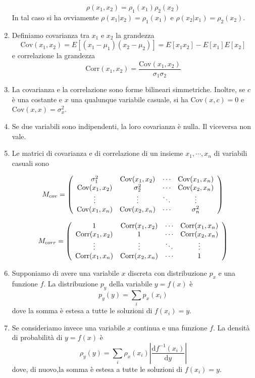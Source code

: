 \documentclass[a4paper,11pt]{article}
\newcommand{\cov}[1]{\textrm{Cov}(#1)}
\newcommand{\corr}[1]{\textrm{Corr}(#1)}
\begin{document}
\begin{enumerate}[resume]
	\[\rho(x_1,x_2)=\rho_1(x_1)\rho_2(x_2)\]
	In tal caso si ha ovviamente $\rho(x_1|x_2)=\rho_1(x_1)$ e $\rho(x_2|x_1)=\rho_2(x_2)$.
	\item Definiamo covarianza tra $x_1$ e $x_2$ la grandezza
	\[\cov{x_1,x_2}=E[(x_1-\mu_1)(x_2-\mu_2)]=E[x_1x_2]-E[x_1]E[x_2]\]
	e correlazione la grandezza
	\[\corr{x_1,x_2}=\frac{\cov{x_1,x_2}}{\sigma_1\sigma_2}\]
	\item La covarianza e la correlazione sono forme bilineari simmetriche. Inoltre, se $c$ è una costante e $x$ una qualunque variabile casuale, si ha $\cov{x,c}=0$ e $\cov{x,x}=\sigma_x^2$.
	\item Se due variabili sono indipendenti, la loro covarianza è nulla. Il viceversa non vale.
	\item Le matrici di covarianza e di correlazione di un insieme $x_1,\cdots,x_n$ di variabili casuali sono
	\vspace{5mm}
	
	\[M_{cov}=\left(\begin{array}{c c c c}
	\sigma_1^2 &\cov{x_1,x_2}&\cdots&\cov{x_1,x_n}\\
	\cov{x_1,x_2}&\sigma_2^2&\cdots&\cov{x_2,x_n}\\
	\vdots&\vdots&\ddots&\vdots\\
	\cov{x_1,x_n}&\cov{x_2,x_n}&\cdots&\sigma_n^2\\
	\end{array}\right)\]
	\vspace{5mm}
	
	\[M_{corr}=\left(\begin{array}{c c c c}
	1 &\corr{x_1,x_2}&\cdots&\corr{x_1,x_n}\\
	\corr{x_1,x_2}&1&\cdots&\corr{x_2,x_n}\\
	\vdots&\vdots&\ddots&\vdots\\
	\corr{x_1,x_n}&\corr{x_2,x_n}&\cdots&1\\
	\end{array}\right)\]
	\item Supponiamo di avere una variabile $x$ discreta con distribuzione $p_x$ e una funzione $f$. La distribuzione $p_y$ della variabile $y=f(x)$ è
	\[p_y(y)=\sum_{i}p_x(x_i)\]
	dove la somma è estesa a tutte le soluzioni di $f(x_i)=y$.
	\item Se consideriamo invece una variabile $x$ continua e una funzione $f$. La densità di probabilità di $y=f(x)$ è \[\rho_y(y)=\sum_{i}\rho_x(x_i)\left|\frac{\mathrm{d}f^{-1}(x_i)}{\mathrm{d}y}\right|\]	
	dove, di nuovo,la somma è estesa a tutte le soluzioni di $f(x_i)=y$. 
	
\end{enumerate}
\end{document}
